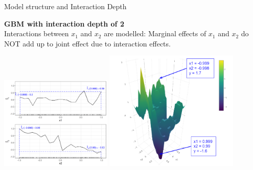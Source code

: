 \documentclass[11pt,compress,t,notes=noshow, xcolor=table]{beamer}
\begin{document}
\begin{vbframe}{Model structure and Interaction Depth}

% 

\framebreak

\textbf{GBM with interaction depth of 2}\\
Interactions between $x_1$ and $x_2$ are modelled: Marginal effects of $x_1$ and $x_2$ do NOT add up to joint effect due to interaction effects.

\begin{center}
\includegraphics[width=0.4\textwidth]{figure/boosting_interaction_example_ID2.png}
\includegraphics[width=0.48\textwidth]{figure/interaction_td2_d3.png}
\end{center}


\end{vbframe}

\endlecture
\end{document}
